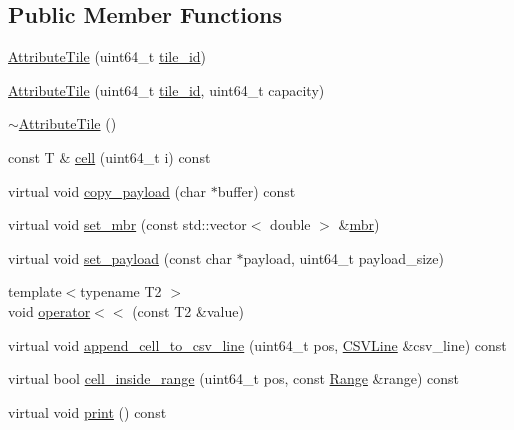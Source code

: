 \subsection*{Public Member Functions}
\begin{DoxyCompactItemize}
\item 
\hyperlink{classAttributeTile_a425f62f25b9464947c9806b5a130141a}{Attribute\+Tile} (uint64\+\_\+t \hyperlink{classTile_a71625eedc3af0cb961f2ab213384f791}{tile\+\_\+id})
\item 
\hyperlink{classAttributeTile_ad4a38b5826b495d3311e0dbca49b320e}{Attribute\+Tile} (uint64\+\_\+t \hyperlink{classTile_a71625eedc3af0cb961f2ab213384f791}{tile\+\_\+id}, uint64\+\_\+t capacity)
\item 
\hyperlink{classAttributeTile_aaac964cdbaa2cec107d6075419b86b83}{$\sim$\+Attribute\+Tile} ()
\item 
const T \& \hyperlink{classAttributeTile_a2b16189b318803219632bf4c23108d15}{cell} (uint64\+\_\+t i) const 
\item 
virtual void \hyperlink{classAttributeTile_a3efe457b7a8a7b3e037505f2ff727a16}{copy\+\_\+payload} (char $\ast$buffer) const 
\item 
virtual void \hyperlink{classAttributeTile_a93c023cc09e3f353055d1f5f0ebab9b6}{set\+\_\+mbr} (const std\+::vector$<$ double $>$ \&\hyperlink{classAttributeTile_ad02895381110d7c6c00e0149a1d96def}{mbr})
\item 
virtual void \hyperlink{classAttributeTile_a73b92c2721036091cf5cd6108050c64f}{set\+\_\+payload} (const char $\ast$payload, uint64\+\_\+t payload\+\_\+size)
\item 
{\footnotesize template$<$typename T2 $>$ }\\void \hyperlink{classAttributeTile_ab4acca838cb30b4429b5f17084704c38}{operator$<$$<$} (const T2 \&value)
\item 
virtual void \hyperlink{classAttributeTile_ae83002fe94e140d82b73c8fc8894dbef}{append\+\_\+cell\+\_\+to\+\_\+csv\+\_\+line} (uint64\+\_\+t pos, \hyperlink{classCSVLine}{C\+S\+V\+Line} \&csv\+\_\+line) const 
\item 
virtual bool \hyperlink{classAttributeTile_acfb6d96b024ee9b7c52b912b189834a3}{cell\+\_\+inside\+\_\+range} (uint64\+\_\+t pos, const \hyperlink{classTile_afc4e8e753d24e2b07f4675bcd9c1dcca}{Range} \&range) const 
\item 
virtual void \hyperlink{classAttributeTile_a2b7207f7204fcf8c274cb2eaaf1e6cc0}{print} () const 
\end{DoxyCompactItemize}
